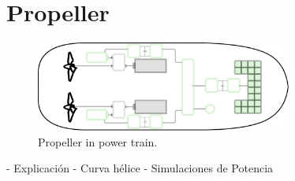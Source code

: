\section{Propeller}

\begin{figure}[!ht]
    \centering
    \includegraphics[width=0.75\textwidth]{images/chapter05/Propeller_scheme.jpg}
    \caption{Propeller in power train.}
    \label{Propeller}
\end{figure}

- Explicación
- Curva hélice
- Simulaciones de Potencia